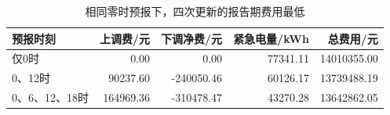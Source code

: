 \begin{table}[H]
\centering\small
\caption{相同零时预报下，四次更新的报告期费用最低}
\label{tab:frequency}
\begin{tabular}{lrrrr}\toprule
预报时刻 & 上调费/元 & 下调净费/元 & 紧急电量/kWh & 总费用/元 \\\midrule
仅0时 & 0.00 & 0.00 & 77341.11 & 14010355.00 \\
0、12时 & 90237.60 & -240050.46 & 60126.17 & 13739488.19 \\
0、6、12、18时 & 164969.36 & -310478.47 & 43270.28 & 13642862.05 \\
\bottomrule\end{tabular}
\end{table}
